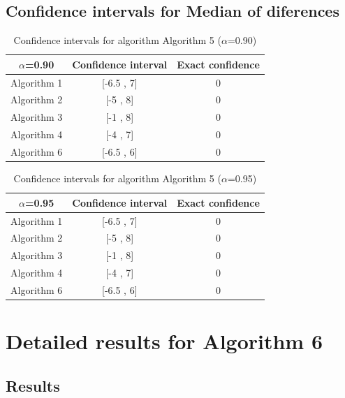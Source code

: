 \documentclass[a4paper,10pt]{article}
\begin{document}
\subsection{Confidence intervals for Median of diferences}

\begin{table}[!htp]
\centering\small
\begin{tabular}{
|c|c|c|}
\hline
 $\alpha$=0.90 & Confidence interval & Exact confidence \\ \hline 
Algorithm 1 & [-6.5 , 7] & 0\\ \hline 
Algorithm 2 & [-5 , 8] & 0\\ \hline 
Algorithm 3 & [-1 , 8] & 0\\ \hline 
Algorithm 4 & [-4 , 7] & 0\\ \hline 
Algorithm 6 & [-6.5 , 6] & 0\\ \hline 

\end{tabular}
\caption{Confidence intervals for algorithm Algorithm 5 ($\alpha$=0.90)}
\end{table}
\begin{table}[!htp]
\centering\small
\begin{tabular}{
|c|c|c|}
\hline
 $\alpha$=0.95 & Confidence interval & Exact confidence \\ \hline 
Algorithm 1 & [-6.5 , 7] & 0\\ \hline 
Algorithm 2 & [-5 , 8] & 0\\ \hline 
Algorithm 3 & [-1 , 8] & 0\\ \hline 
Algorithm 4 & [-4 , 7] & 0\\ \hline 
Algorithm 6 & [-6.5 , 6] & 0\\ \hline 

\end{tabular}
\caption{Confidence intervals for algorithm Algorithm 5 ($\alpha$=0.95)}
\end{table}

 \clearpage 


\section{Detailed results for Algorithm 6}


\subsection{Results}
\end{document}

